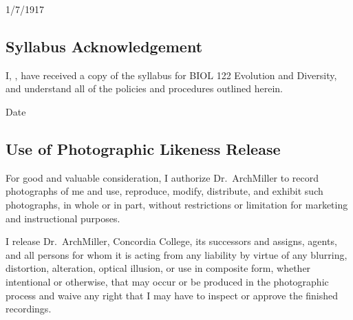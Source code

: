 \documentclass{tufte-handout}
\begin{document}
\begin{fullwidth}
\begin{calendar}{1/7/19}{17}




  \end{calendar}



\end{fullwidth}



\newpage

\subsection{Syllabus Acknowledgement}

I, \underline{\hspace{5cm}}, have received a copy of the syllabus for BIOL 122 Evolution and Diversity, and understand all of the policies and procedures outlined herein. 

  \underline{\hspace{5cm}} {Date}  \hrulefill


\subsection{Use of Photographic Likeness Release}

For good and valuable consideration, I authorize Dr.~ArchMiller to record photographs of me and use, reproduce, modify, distribute, and exhibit such photographs, in whole or in part, without restrictions or limitation for marketing and instructional purposes. 

I release Dr.~ArchMiller, Concordia College, its successors and assigns, agents, and all persons for whom it is acting from any liability by virtue of any blurring, distortion, alteration, optical illusion, or use in composite form, whether intentional or otherwise, that may occur or be produced in the photographic process and waive any right that I may have to inspect or approve the finished recordings.
\end{document}

